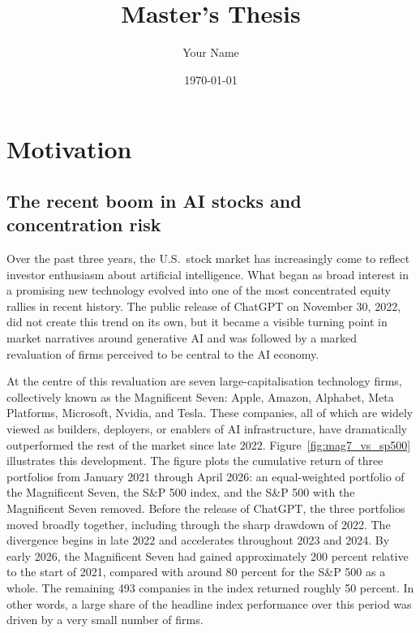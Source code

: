 \documentclass[12pt,a4paper]{article}
\begin{document}
\title{Master's Thesis}
\author{Your Name}
\date{\today}

\maketitle

\section{Motivation}

\subsection{The recent boom in AI stocks and concentration risk}

Over the past three years, the U.S.\ stock market has increasingly come to reflect investor enthusiasm about artificial intelligence. What began as broad interest in a promising new technology evolved into one of the most concentrated equity rallies in recent history. The public release of ChatGPT on November 30, 2022, did not create this trend on its own, but it became a visible turning point in market narratives around generative AI and was followed by a marked revaluation of firms perceived to be central to the AI economy.

At the centre of this revaluation are seven large-capitalisation technology firms, collectively known as the Magnificent Seven: Apple, Amazon, Alphabet, Meta Platforms, Microsoft, Nvidia, and Tesla. These companies, all of which are widely viewed as builders, deployers, or enablers of AI infrastructure, have dramatically outperformed the rest of the market since late 2022. Figure~\ref{fig:mag7_vs_sp500} illustrates this development. The figure plots the cumulative return of three portfolios from January 2021 through April 2026: an equal-weighted portfolio of the Magnificent Seven, the S\&P 500 index, and the S\&P 500 with the Magnificent Seven removed. Before the release of ChatGPT, the three portfolios moved broadly together, including through the sharp drawdown of 2022. The divergence begins in late 2022 and accelerates throughout 2023 and 2024. By early 2026, the Magnificent Seven had gained approximately 200 percent relative to the start of 2021, compared with around 80 percent for the S\&P 500 as a whole. The remaining 493 companies in the index returned roughly 50 percent. In other words, a large share of the headline index performance over this period was driven by a very small number of firms.
\end{document}
